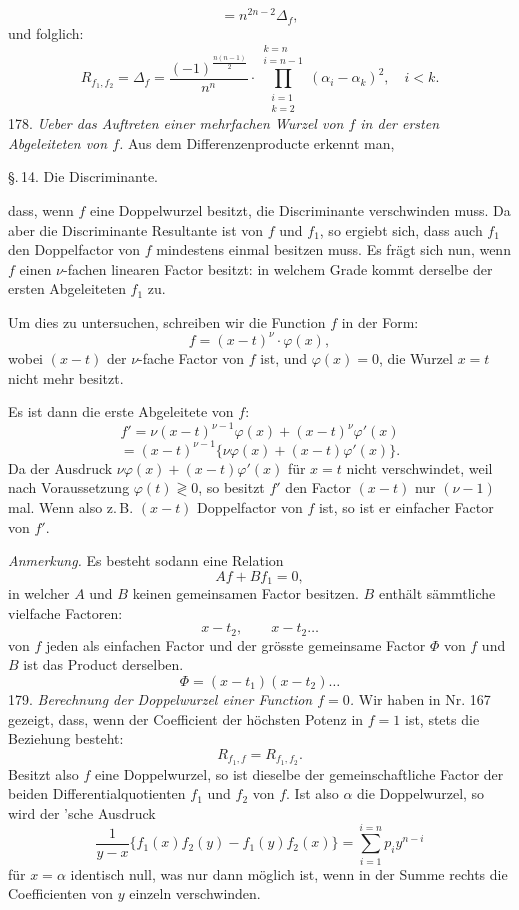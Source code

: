 \documentclass[11pt]{article}
\providecommand{\gesperrt}[1]{\textls[130]{#1}}
\providecommand{\weberpage}[1]{}
\let\Delta\varDelta
\let\Phi\varPhi
\begin{document}
\[
= n^{2n-2} \Delta_f,
\]
und folglich:
\[
R_{f_1,f_2} = \Delta_f = \dfrac{(-1)^{\frac{n(n-1)}{2}}}{n^n} \cdot \prod_{\substack{i=1 \\ k=2}}^{\substack{k=n \\ i=n-1}} (\alpha_i - \alpha_k)^2, \quad i<k.
\]
178. \textit{Ueber das Auftreten einer mehrfachen Wurzel von $f$ in der ersten Abgeleiteten von $f$.} Aus dem Differenzenproducte erkennt man,


\weberpage{191}
\S.\,14. Die Discriminante.

dass, wenn $f$ eine Doppelwurzel besitzt, die Discriminante verschwinden
muss. Da aber die Discriminante Resultante ist von $f$ und $f_1$, so ergiebt
sich, dass auch $f_1$ den Doppelfactor von $f$ mindestens einmal
besitzen muss. Es frägt sich nun, wenn $f$ einen $\nu$-fachen linearen
Factor besitzt: in welchem Grade kommt derselbe der ersten Abgeleiteten $f_1$ zu.

Um dies zu untersuchen, schreiben wir die Function $f$ in der Form:
\[
f = (x-t)^\nu \cdot \varphi(x),
\]
wobei $(x-t)$ der $\nu$-fache Factor von $f$ ist, und $\varphi(x)=0$, die
Wurzel $x=t$ nicht mehr besitzt.

Es ist dann die erste Abgeleitete von $f$:
\[
f' = \nu (x-t)^{\nu-1} \varphi(x) + (x-t)^\nu \varphi'(x)
\]
\[
= (x-t)^{\nu-1} \{\nu \varphi(x) + (x-t) \varphi'(x)\}.
\]
Da der Ausdruck $\nu \varphi(x) + (x-t)\varphi'(x)$ für $x=t$ nicht verschwindet,
weil nach Voraussetzung $\varphi(t) \gtrless 0$, so besitzt $f'$ den Factor $(x-t)$
nur $(\nu-1)$mal. Wenn also z.\,B. $(x-t)$ Doppelfactor von $f$ ist, so
ist er einfacher Factor von $f'$.

\textit{Anmerkung.} Es besteht sodann eine Relation
\[
Af + Bf_1 = 0,
\]
in welcher $A$ und $B$ keinen gemeinsamen Factor besitzen. $B$ enthält
sämmtliche vielfache Factoren:
\[
x - t_2, \qquad x - t_2 \ldots %
\]
von $f$ jeden als einfachen Factor und der grösste gemeinsame Factor $\Phi$
von $f$ und $B$ ist das Product derselben.
\[
\Phi = (x-t_1)(x-t_2) \ldots
\]
179. \textit{Berechnung der Doppelwurzel einer Function $f=0$.} Wir
haben in Nr. 167 gezeigt, dass, wenn der Coefficient der höchsten
Potenz in $f=1$ ist, stets die Beziehung besteht:
\[
R_{f_1,f} = R_{f_1,f_2}.
\]
Besitzt also $f$ eine Doppelwurzel, so ist dieselbe der gemeinschaftliche Factor der beiden Differentialquotienten $f_1$ und $f_2$ von $f$.
Ist also $\alpha$ die Doppelwurzel, so wird der \gesperrt{Cayley}'sche Ausdruck
\[
\frac{1}{y-x} \{f_1(x)f_2(y) - f_1(y)f_2(x)\} = \sum_{i=1}^{i=n} p_i y^{n-i}
\]
für $x=\alpha$ identisch null, was nur dann möglich ist, wenn in der
Summe rechts die Coefficienten von $y$ einzeln verschwinden.
\end{document}

